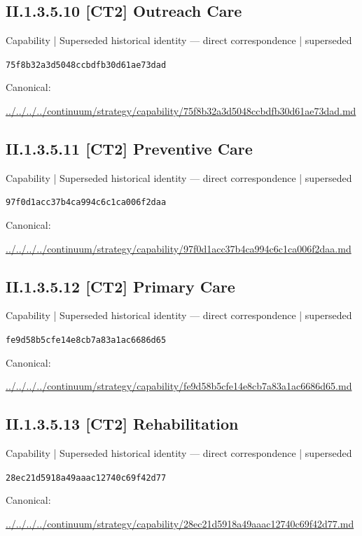 \documentclass[10pt,a4paper]{article}
\begin{document}
\subsection*{II.1.3.5.10 [CT2] Outreach Care}
{\small Capability | Superseded historical identity — direct correspondence | superseded}\par
\texttt{75f8b32a3d5048ccbdfb30d61ae73dad}\par
Canonical: \par
{\footnotesize\url{../../../../continuum/strategy/capability/75f8b32a3d5048ccbdfb30d61ae73dad.md}}\par
\subsection*{II.1.3.5.11 [CT2] Preventive Care}
{\small Capability | Superseded historical identity — direct correspondence | superseded}\par
\texttt{97f0d1acc37b4ca994c6c1ca006f2daa}\par
Canonical: \par
{\footnotesize\url{../../../../continuum/strategy/capability/97f0d1acc37b4ca994c6c1ca006f2daa.md}}\par
\subsection*{II.1.3.5.12 [CT2] Primary Care}
{\small Capability | Superseded historical identity — direct correspondence | superseded}\par
\texttt{fe9d58b5cfe14e8cb7a83a1ac6686d65}\par
Canonical: \par
{\footnotesize\url{../../../../continuum/strategy/capability/fe9d58b5cfe14e8cb7a83a1ac6686d65.md}}\par
\subsection*{II.1.3.5.13 [CT2] Rehabilitation}
{\small Capability | Superseded historical identity — direct correspondence | superseded}\par
\texttt{28ec21d5918a49aaac12740c69f42d77}\par
Canonical: \par
{\footnotesize\url{../../../../continuum/strategy/capability/28ec21d5918a49aaac12740c69f42d77.md}}\par
\end{document}
